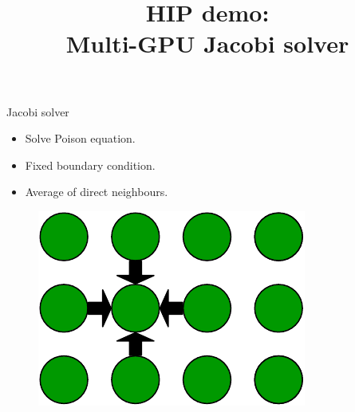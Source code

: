 \documentclass[aspectratio=169]{beamer}
\title[Your Short Title]{HIP demo: \\ Multi-GPU Jacobi solver}
\begin{document}
\begin{frame}
  \titlepage
\end{frame}

\begin{frame}{Jacobi solver}
\begin{itemize}
    \item Solve Poison equation.
    \item Fixed boundary condition.
    \item Average of direct neighbours.
\end{itemize}
\begin{figure}[hb!]
    \centering
    \includegraphics[scale=0.5]{figs/jacobi.pdf}
    \label{fig:my_label}
\end{figure}
\end{frame}
\end{document}
